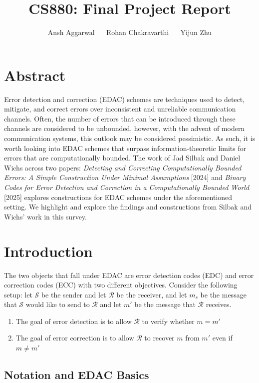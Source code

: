\documentclass[12pt]{article}%
\title{CS880: Final Project Report}
\author{Ansh Aggarwal $\quad$ Rohan Chakravarthi $\quad$ Yijun Zhu}
\date{}
\newcommand{\Sen}{\mathcal{S}}
\newcommand{\Rec}{\mathcal{R}}
\begin{document}
\maketitle
\vspace{10.0cm}
\section{Abstract}
Error detection and correction (EDAC) schemes are techniques used to detect, mitigate, and correct errors over inconsistent and unreliable communication channels. Often, the number of errors that can be introduced through these channels are considered to be unbounded, however, with the advent of modern communication systems, this outlook may be considered pessimistic. As such, it is worth looking into EDAC schemes that surpass information-theoretic limits for errors that are computationally bounded. The work of Jad Silbak and Daniel Wichs across two papers: \textit{Detecting and Correcting Computationally Bounded Errors: A Simple Construction Under Minimal Assumptions} [2024] and \textit{Binary Codes for Error Detection and Correction
in a Computationally Bounded World} [2025] explores constructions for EDAC schemes under the aforementioned setting. We highlight and explore the findings and constructions from Silbak and Wichs' work in this survey. \newpage 

\tableofcontents

\section{Introduction}
The two objects that fall under EDAC are error detection codes (EDC) and error correction codes (ECC) with two different objectives. Consider the following setup: let $\Sen$ be the sender and let $\Rec$ be the receiver, and let $m_s$ be the message that $\Sen$ would like to send to $\Rec$ and let $m'$ be the message that $\Rec$ receives. \begin{enumerate}
    \item The goal of error detection is to allow $\Rec$ to verify whether $m = m'$
    \item The goal of error correction is to allow $\Rec$ to recover $m$ from $m'$ even if $m \not = m'$
\end{enumerate} 

\subsection{Notation and EDAC Basics}
\end{document}
